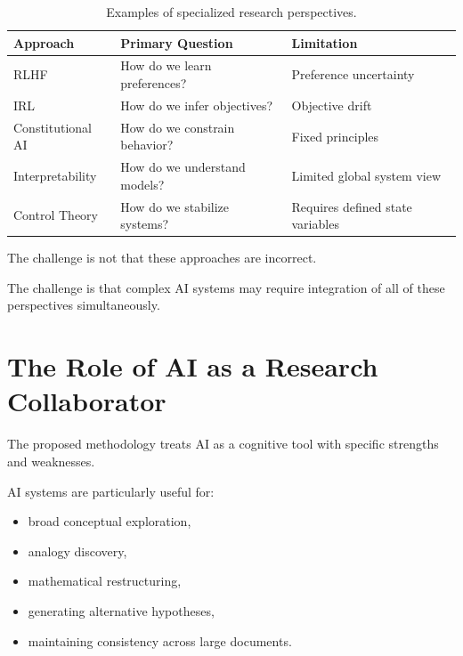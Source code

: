 \documentclass[11pt]{article}
\begin{document}
\begin{table}[h]

\centering

\begin{tabular}{lll}

\toprule

Approach & Primary Question & Limitation \\

\midrule

RLHF
& How do we learn preferences?
& Preference uncertainty
\\

IRL
& How do we infer objectives?
& Objective drift
\\

Constitutional AI
& How do we constrain behavior?
& Fixed principles
\\

Interpretability
& How do we understand models?
& Limited global system view
\\

Control Theory
& How do we stabilize systems?
& Requires defined state variables
\\

\bottomrule

\end{tabular}

\caption{
Examples of specialized research perspectives.
}

\end{table}



The challenge is not that these approaches are incorrect.


The challenge is that complex AI systems may require integration of all
of these perspectives simultaneously.



\section{The Role of AI as a Research Collaborator}


The proposed methodology treats AI as a cognitive tool with specific
strengths and weaknesses.



AI systems are particularly useful for:


\begin{itemize}

\item broad conceptual exploration,

\item analogy discovery,

\item mathematical restructuring,

\item generating alternative hypotheses,

\item maintaining consistency across large documents.

\end{itemize}
\end{document}
